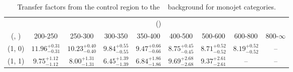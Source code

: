 \begin{table}[h!]
\tiny
\centering
\caption{Transfer factors from the \mmj control region to the \zInv~ background for monojet categories.\label{tab:tf_mumu_zinv_mono}}
\begin{tabular}
{ccccccccc}
	\hline\hline
	& \multicolumn{8}{c}{\scalht (\gev)} \\ 
	 (\njet,  \nb) & 200-250 & 250-300 & 300-350 & 350-400 & 400-500 & 500-600 & 600-800 & 800-$\infty$ \\ [0.8ex] 
\hline
	(1, 0) & $11.96^{+ 0.31 }_{- 0.31 }$ & $10.23^{+ 0.40 }_{- 0.40 }$ & $9.84^{+ 0.55 }_{- 0.55 }$ & $9.47^{+ 0.66 }_{- 0.66 }$ & $8.75^{+ 0.45 }_{- 0.45 }$ & $8.71^{+ 0.52 }_{- 0.52 }$ & $8.19^{+ 0.52 }_{- 0.52 }$ & -- \\[0.5ex] 
	(1, 1) & $9.75^{+ 1.12 }_{- 1.12 }$ & $8.00^{+ 1.31 }_{- 1.31 }$ & $6.45^{+ 1.39 }_{- 1.39 }$ & $6.84^{+ 1.86 }_{- 1.86 }$ & $9.69^{+ 2.68 }_{- 2.68 }$ & $9.37^{+ 2.61 }_{- 2.61 }$ & -- & -- \\[0.5ex] 
	\hline
	\hline
\end{tabular}
\end{table}
